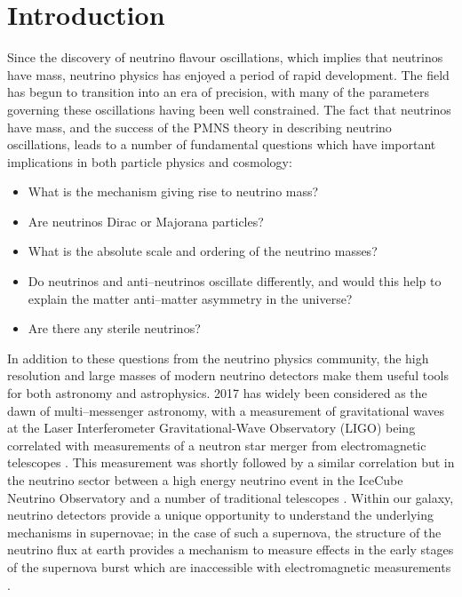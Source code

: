 \chapter{\label{ch:intro}Introduction} 

\minitoc

Since the discovery of neutrino flavour oscillations, which implies that
neutrinos have mass, neutrino physics has enjoyed a period of rapid development.
The field has begun to transition into an era of precision, with many of the
parameters governing these oscillations having been well constrained. The fact
that neutrinos have mass, and the success of the PMNS theory in describing
neutrino oscillations, leads to a number of fundamental questions which have
important implications in both particle physics and cosmology: 

\begin{itemize}
	\item What is the mechanism giving rise to neutrino mass? 
	\item Are neutrinos Dirac or Majorana particles?
	\item What is the absolute scale and ordering of the neutrino masses?
	\item Do neutrinos and anti--neutrinos oscillate differently, and would this 
	      help to explain the matter anti--matter asymmetry in the universe?
	\item Are there any sterile neutrinos?
\end{itemize}

In addition to these questions from the neutrino physics community, the high
resolution and large masses of modern neutrino detectors make them useful tools
for both astronomy and astrophysics. 2017 has widely been considered as the dawn
of multi--messenger astronomy, with a measurement of gravitational waves at the 
Laser Interferometer Gravitational-Wave Observatory (LIGO) being correlated 
with measurements of a neutron star merger from electromagnetic telescopes 
\cite{Abbott2017}. This measurement was shortly followed by a similar 
correlation but in the neutrino sector between a high energy neutrino event in 
the IceCube Neutrino Observatory and a number of traditional telescopes 
\cite{Aartsen2018}. Within our galaxy, neutrino detectors provide a unique 
opportunity to understand the underlying mechanisms in supernovae; in the case 
of such a supernova, the structure of the neutrino flux at earth provides a 
mechanism to measure effects in the early stages of the supernova burst which 
are inaccessible with electromagnetic measurements \cite{Scholberg:2012id}.

